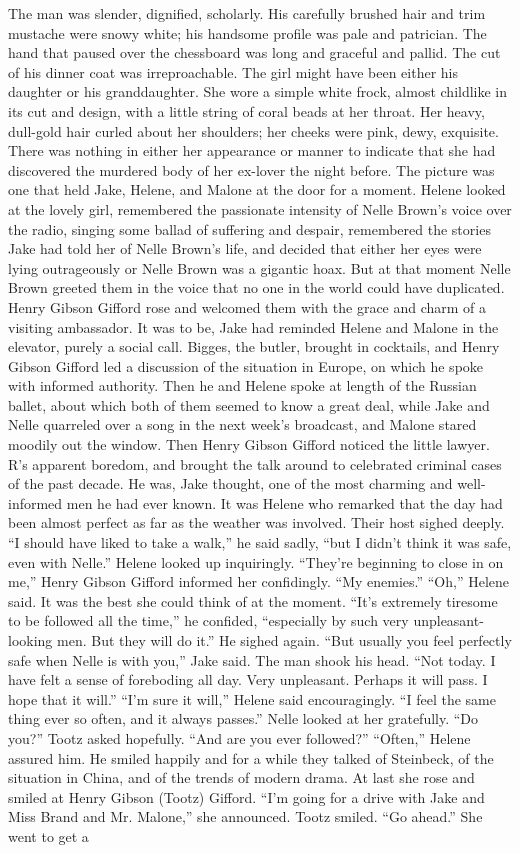 \documentclass{novel}
\begin{document}
The man was slender, dignified, scholarly. His carefully brushed hair and trim mustache were snowy white; his handsome profile was pale and patrician. The hand that paused over the chessboard was long and graceful and pallid. The cut of his dinner coat was irreproachable. The girl might have been either his daughter or his granddaughter. She wore a simple white frock, almost childlike in its cut and design, with a little string of coral beads at her throat. Her heavy, dull-gold hair curled about her shoulders; her cheeks were pink, dewy, exquisite. There was nothing in either her appearance or manner to indicate that she had discovered the murdered body of her ex-lover the night before. The picture was one that held Jake, Helene, and Malone at the door for a moment. Helene looked at the lovely girl, remembered the passionate intensity of Nelle Brown’s voice over the radio, singing some ballad of suffering and despair, remembered the stories Jake had told her of Nelle Brown’s life, and decided that either her eyes were lying outrageously or Nelle Brown was a gigantic hoax. But at that moment Nelle Brown greeted them in the voice that no one in the world could have duplicated. Henry Gibson Gifford rose and welcomed them with the grace and charm of a visiting ambassador. It was to be, Jake had reminded Helene and Malone in the elevator, purely a social call. Bigges, the butler, brought in cocktails, and Henry Gibson Gifford led a discussion of the situation in Europe, on which he spoke with informed authority. Then he and Helene spoke at length of the Russian ballet, about which both of them seemed to know a great deal, while Jake and Nelle quarreled over a song in the next week’s broadcast, and Malone stared moodily out the window. Then Henry Gibson Gifford noticed the little lawyer. R’s apparent boredom, and brought the talk around to celebrated criminal cases of the past decade. He was, Jake thought, one of the most charming and well-informed men he had ever known. It was Helene who remarked that the day had been almost perfect as far as the weather was involved. Their host sighed deeply. “I should have liked to take a walk,” he said sadly, “but I didn’t think it was safe, even with Nelle.” Helene looked up inquiringly. “They’re beginning to close in on me,” Henry Gibson Gifford informed her confidingly. “My enemies.” “Oh,” Helene said. It was the best she could think of at the moment. “It’s extremely tiresome to be followed all the time,” he confided, “especially by such very unpleasant-looking men. But they will do it.” He sighed again. “But usually you feel perfectly safe when Nelle is with you,” Jake said. The man shook his head. “Not today. I have felt a sense of foreboding all day. Very unpleasant. Perhaps it will pass. I hope that it will.” “I’m sure it will,” Helene said encouragingly. “I feel the same thing ever so often, and it always passes.” Nelle looked at her gratefully. “Do you?” Tootz asked hopefully. “And are you ever followed?” “Often,” Helene assured him. He smiled happily and for a while they talked of Steinbeck, of the situation in China, and of the trends of modern drama. At last she rose and smiled at Henry Gibson (Tootz) Gifford. “I’m going for a drive with Jake and Miss Brand and Mr. Malone,” she announced. Tootz smiled. “Go ahead.” She went to get a 
\end{document}
